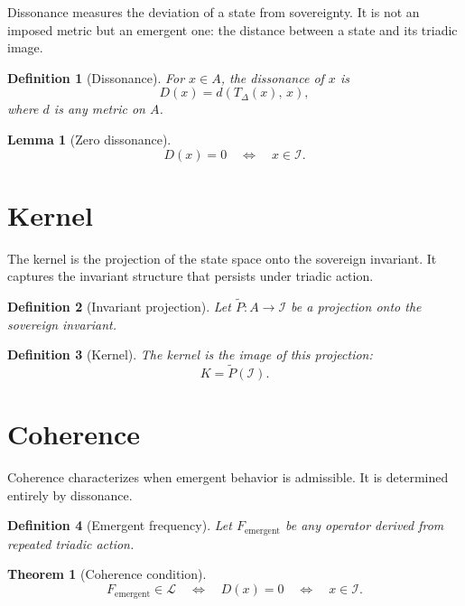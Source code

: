 \documentclass[12pt]{article}
\newtheorem{definition}{Definition}
\newtheorem{lemma}{Lemma}
\newtheorem{theorem}{Theorem}
\begin{document}
Dissonance measures the deviation of a state from sovereignty. It is not
an imposed metric but an emergent one: the distance between a state and
its triadic image.

\begin{definition}[Dissonance]
For $x\in A$, the dissonance of $x$ is
\[
D(x) = d(T_\Delta(x),\, x),
\]
where $d$ is any metric on $A$.
\end{definition}

\begin{lemma}[Zero dissonance]
\[
D(x)=0 \quad\Longleftrightarrow\quad x\in\mathcal{I}.
\]
\end{lemma}

\section{Kernel}

The kernel is the projection of the state space onto the sovereign
invariant. It captures the invariant structure that persists under
triadic action.

\begin{definition}[Invariant projection]
Let $\tilde{P}:A\to\mathcal{I}$ be a projection onto the sovereign
invariant.
\end{definition}

\begin{definition}[Kernel]
The kernel is the image of this projection:
\[
K = \tilde{P}(\mathcal{I}).
\]
\end{definition}

\section{Coherence}

Coherence characterizes when emergent behavior is admissible. It is
determined entirely by dissonance.

\begin{definition}[Emergent frequency]
Let $F_{\mathrm{emergent}}$ be any operator derived from repeated
triadic action.
\end{definition}

\begin{theorem}[Coherence condition]
\[
F_{\mathrm{emergent}} \in \mathcal{L}
\quad\Longleftrightarrow\quad
D(x)=0
\quad\Longleftrightarrow\quad
x\in\mathcal{I}.
\]
\end{theorem}
\end{document}
